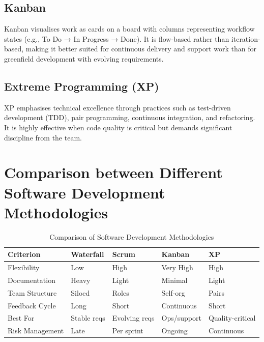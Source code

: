 \documentclass[12pt,a4paper]{report}
\begin{document}
\subsection{Kanban}
Kanban visualises work as cards on a board with columns representing workflow states (e.g., To Do → In Progress → Done). It is flow-based rather than iteration-based, making it better suited for continuous delivery and support work than for greenfield development with evolving requirements.

\subsection{Extreme Programming (XP)}
XP emphasises technical excellence through practices such as test-driven development (TDD), pair programming, continuous integration, and refactoring. It is highly effective when code quality is critical but demands significant discipline from the team.

\section{Comparison between Different Software Development Methodologies}

\begin{table}[H]
\centering
\caption{Comparison of Software Development Methodologies}
\renewcommand{\arraystretch}{1.3}
\begin{tabularx}{\linewidth}{lXXXX}
\toprule
\textbf{Criterion} & \textbf{Waterfall} & \textbf{Scrum} & \textbf{Kanban} & \textbf{XP} \\
\midrule
Flexibility         & Low    & High   & Very High & High \\
Documentation       & Heavy  & Light  & Minimal   & Light \\
Team Structure      & Siloed & Roles  & Self-org  & Pairs \\
Feedback Cycle      & Long   & Short  & Continuous & Short \\
Best For            & Stable reqs & Evolving reqs & Ops/support & Quality-critical \\
Risk Management     & Late   & Per sprint & Ongoing & Continuous \\
\bottomrule
\end{tabularx}
\end{table}

\end{document}
